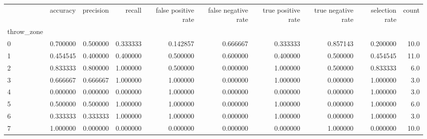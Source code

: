 \begin{tabular}{lrrrrrrrrr}
\toprule
{} &  accuracy &  precision &    recall &  false positive rate &  false negative rate &  true positive rate &  true negative rate &  selection rate &  count \\
throw\_zone &           &            &           &                      &                      &                     &                     &                 &        \\
\midrule
0          &  0.700000 &   0.500000 &  0.333333 &             0.142857 &             0.666667 &            0.333333 &            0.857143 &        0.200000 &   10.0 \\
1          &  0.454545 &   0.400000 &  0.400000 &             0.500000 &             0.600000 &            0.400000 &            0.500000 &        0.454545 &   11.0 \\
2          &  0.833333 &   0.800000 &  1.000000 &             0.500000 &             0.000000 &            1.000000 &            0.500000 &        0.833333 &    6.0 \\
3          &  0.666667 &   0.666667 &  1.000000 &             1.000000 &             0.000000 &            1.000000 &            0.000000 &        1.000000 &    3.0 \\
4          &  0.000000 &   0.000000 &  0.000000 &             1.000000 &             0.000000 &            0.000000 &            0.000000 &        1.000000 &    3.0 \\
5          &  0.500000 &   0.500000 &  1.000000 &             1.000000 &             0.000000 &            1.000000 &            0.000000 &        1.000000 &    6.0 \\
6          &  0.333333 &   0.333333 &  1.000000 &             1.000000 &             0.000000 &            1.000000 &            0.000000 &        1.000000 &    3.0 \\
7          &  1.000000 &   0.000000 &  0.000000 &             0.000000 &             0.000000 &            0.000000 &            1.000000 &        0.000000 &   10.0 \\
\bottomrule
\end{tabular}
